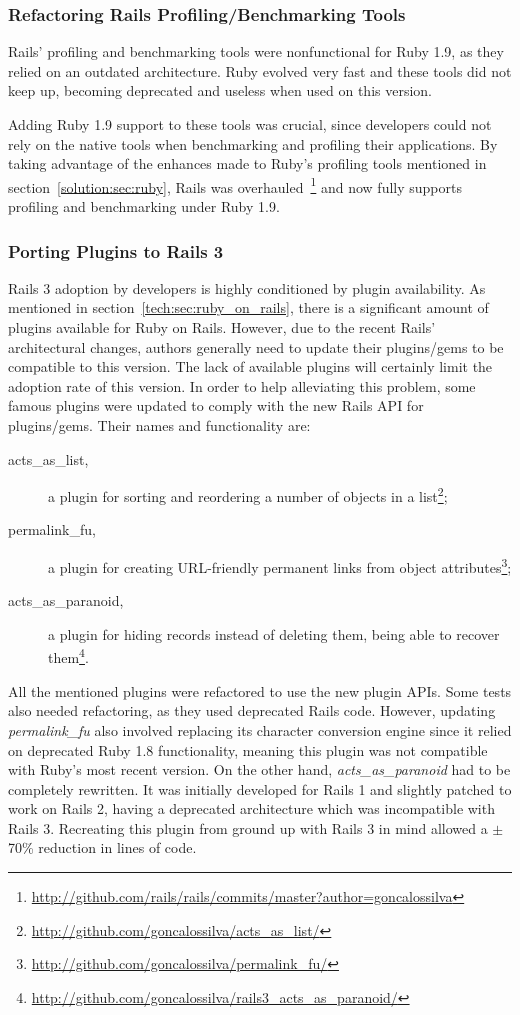\subsubsection{Refactoring Rails Profiling/Benchmarking Tools}
Rails' profiling and benchmarking tools were nonfunctional for Ruby 1.9, as they relied on an outdated architecture. Ruby evolved very fast and these tools did not keep up, becoming deprecated and useless when used on this version.

Adding Ruby 1.9  support to these tools was crucial, since developers could not rely on the native tools when benchmarking and profiling their applications. By taking advantage of the enhances made to Ruby's profiling tools mentioned in section~\ref{solution:sec:ruby}, Rails was overhauled~\footnote{\url{http://github.com/rails/rails/commits/master?author=goncalossilva}} and now fully supports profiling and benchmarking under Ruby 1.9.

\subsubsection{Porting Plugins to Rails 3}
Rails 3 adoption by developers is highly conditioned by plugin availability. As mentioned in section~\ref{tech:sec:ruby_on_rails}, there is a significant amount of plugins available for Ruby on Rails. However, due to the recent Rails' architectural changes, authors generally need to update their plugins/gems to be compatible to this version. The lack of available plugins will certainly limit the adoption rate of this version. In order to help alleviating this problem, some famous plugins were updated to comply with the new Rails API for plugins/gems. Their names and functionality are:
\begin{description}
  \item[acts\_as\_list,] a plugin for sorting and reordering a number of objects in a list\footnote{\url{http://github.com/goncalossilva/acts_as_list/}};
  \item[permalink\_fu,] a plugin for creating URL-friendly permanent links from object attributes\footnote{\url{http://github.com/goncalossilva/permalink_fu/}};
  \item[acts\_as\_paranoid,] a plugin for hiding records instead of deleting them, being able to recover them\footnote{\url{http://github.com/goncalossilva/rails3_acts_as_paranoid/}}.
\end{description}
All the mentioned plugins were refactored to use the new plugin APIs. Some tests also needed refactoring, as they used deprecated Rails code. However, updating \textit{permalink\_fu} also involved replacing its character conversion engine since it relied on deprecated Ruby 1.8 functionality, meaning this plugin was not compatible with Ruby's most recent version. On the other hand, \textit{acts\_as\_paranoid} had to be completely rewritten. It was initially developed for Rails 1 and slightly patched to work on Rails 2, having a deprecated architecture which was incompatible with Rails 3. Recreating this plugin from ground up with Rails 3 in mind allowed a $\pm$70\% reduction in lines of code.

